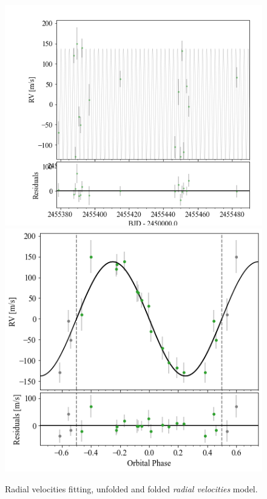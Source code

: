 \documentclass[a4paper,11pt,twocolumn]{article}
\begin{document}
\begin{figure}[H]
	\centering
	\includegraphics[scale=0.4, angle=0]{../pictures/RV/RV_unfolded.png}
	\includegraphics[scale=0.4, angle=0]{../pictures/RV/RV.png}
	\caption{Radial velocities fitting, unfolded and folded \textit{radial velocities} model.}
	\label{fig:RV1}
\end{figure}
\end{document}
